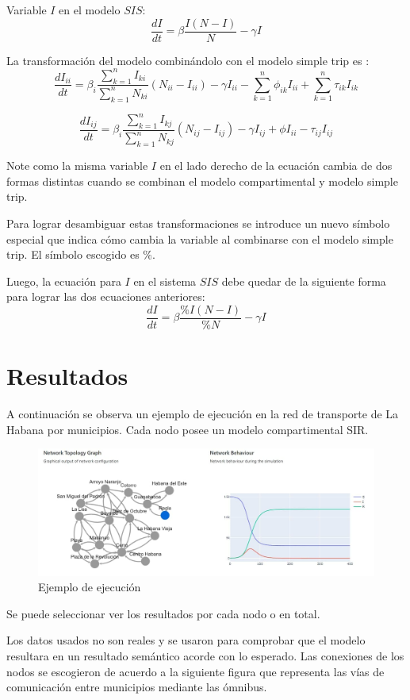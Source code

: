 \documentclass[a4paper,10pt,twocolumn]{article}
\begin{document}
Variable $I$ en el modelo $SIS$:
$$
	\frac{dI}{dt}= \beta \frac{I(N-I)}{N}  - \gamma I
$$

La transformaci\'on del modelo combin\'andolo con el modelo simple trip es :
$$
	\frac{dI_{ii}}{dt} = \beta_i \frac{\sum_{k=1}^{n} I_{ki}}{\sum_{k=1}^{n}N_{ki}} (N_{ii} - I_{ii}) - \gamma I_{ii}
	- \sum_{k=1}^{n}\phi_{ik}I_{ii} + \sum_{k=1}^{n}\tau_{ik}I_{ik}
$$

$$
\frac{dI_{ij}}{dt} = \beta_i \frac{\sum_{k=1}^{n} I_{kj}}{\sum_{k=1}^{n}N_{kj}} (N_{ij} - I_{ij}) - \gamma I_{ij} + \phi I_{ii} - \tau_{ij}I_{ij}
$$

Note como la misma variable $I$ en el lado derecho de la ecuaci\'on cambia de dos formas distintas cuando se combinan el modelo compartimental y modelo simple trip.

Para lograr desambiguar estas transformaciones se introduce un nuevo  s\'imbolo especial que indica c\'omo cambia la variable al combinarse con el modelo simple trip. El s\'imbolo escogido es $\%$.

Luego, la ecuaci\'on para $I$ en el sistema $SIS$ debe quedar de la siguiente forma para lograr las dos ecuaciones anteriores:
$$
	\frac{dI}{dt}= \beta \frac{\%I(N-I)}{\%N}  - \gamma I
$$


\section{Resultados}\label{sec:conc}

A continuaci\'on se observa un ejemplo de ejecuci\'on en la red de transporte de La Habana por municipios. Cada nodo posee un modelo compartimental SIR. 
\begin{figure}[H]
	\centering
	\includegraphics[width=0.7\linewidth]{test}
	\caption{Ejemplo de ejecuci\'on}

\end{figure}

Se puede seleccionar ver los resultados por cada nodo o en total. 

Los datos usados no son reales y se usaron para comprobar que el modelo resultara en un resultado sem\'antico acorde con lo esperado. Las conexiones de los nodos se escogieron de acuerdo a la siguiente figura que representa las v\'ias de comunicaci\'on entre municipios mediante las \'omnibus.
\end{document}
